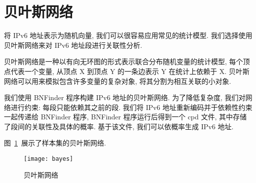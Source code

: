 \section{贝叶斯网络}

将 IPv6 地址表示为随机向量, 我们可以很容易应用常见的统计模型. 我们选择使用贝叶斯网络来对 IPv6 地址段进行关联性分析.

贝叶斯网络是一种以有向无环图的形式表示联合分布随机变量的统计模型, 每个顶点代表一个变量, 从顶点 X 到顶点 Y 的一条边表示 Y 在统计上依赖于 X. 贝叶斯网络可以用来模拟包含许多变量的复杂对象, 将其分割为相互关联的小对象.

我们使用 BNFinder 程序构建 IPv6 地址的贝叶斯网络. 为了降低复杂度, 我们对网络进行约束: 每段只能依赖其之前的段. 我们将 IPv6 地址重新编码并于依赖性约束一起传递给 BNFinder 程序, BNFinder 程序运行后得到一个 cpd 文件, 其中存储了段间的关联性及具体的概率. 基于该文件, 我们可以依概率生成 IPv6 地址.

图~\ref{fig:bayes}~展示了样本集的贝叶斯网络.

\begin{figure}[htbp]
\centering
\texttt{[image: bayes]}
\caption{贝叶斯网络}
\label{fig:bayes}
\end{figure}
